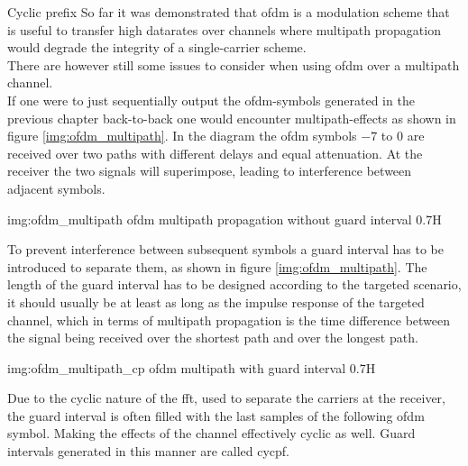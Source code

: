 \begin{subchapter}{Cyclic prefix}
  So far it was demonstrated that \gls{ofdm} is a modulation scheme
  that is useful to transfer high datarates over channels
  where multipath propagation would degrade the integrity of
  a single-carrier scheme. \\
  There are however still some issues to consider when using
  \gls{ofdm} over a multipath channel. \\

  If one were to just sequentially output the \acrshort{ofdm}-symbols
  generated in the previous chapter back-to-back one would encounter multipath-effects
  as shown in figure \ref{img:ofdm_multipath}.
  In the diagram the \acrshort{ofdm} symbols $-7$ to $0$ are received
  over two paths with different delays and equal attenuation.
  At the receiver the two signals will superimpose, leading
  to interference between adjacent symbols.

               {img:ofdm_multipath}
               {\acrshort{ofdm} multipath propagation without guard interval}
               {0.7}{H}

  To prevent interference between subsequent symbols a guard interval has
  to be introduced to separate them, as shown in figure \ref{img:ofdm_multipath}.
  The length of the guard interval has to be designed according to
  the targeted scenario, it should usually be at least as long as the
  impulse response of the targeted channel,
  which in terms of multipath propagation is the time difference between
  the signal being received over the shortest path and over the longest path\cite{kammeyer2012}.

               {img:ofdm_multipath_cp}
               {\acrshort{ofdm} multipath with guard interval}
               {0.7}{H}

  Due to the cyclic nature of the \gls{fft}, used to separate the
  carriers at the receiver, the guard interval
  is often filled with the last samples of the following \gls{ofdm}
  symbol. Making the effects of the channel effectively cyclic
  as well.
  Guard intervals generated in this manner are called \gls{cycpf}.
\end{subchapter}

